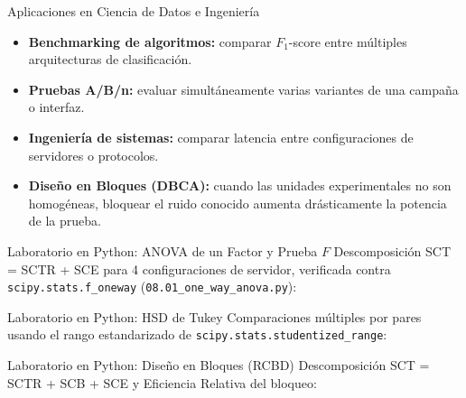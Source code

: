 \documentclass[10pt, aspectratio=169]{beamer}
\begin{document}
\begin{frame}{Aplicaciones en Ciencia de Datos e Ingeniería}
  \footnotesize
  \begin{itemize}\itemsep=0.1cm
    \item \textbf{Benchmarking de algoritmos:} comparar $F_1$-score entre múltiples arquitecturas de clasificación. \pause
    \item \textbf{Pruebas A/B/n:} evaluar simultáneamente varias variantes de una campaña o interfaz. \pause
    \item \textbf{Ingeniería de sistemas:} comparar latencia entre configuraciones de servidores o protocolos. \pause
    \item \textbf{Diseño en Bloques (DBCA):} cuando las unidades experimentales no son homogéneas, bloquear el ruido conocido aumenta drásticamente la potencia de la prueba.
  \end{itemize}
\end{frame}

\begin{frame}[fragile]{Laboratorio en Python: ANOVA de un Factor y Prueba $F$}
  \scriptsize
  Descomposición SCT = SCTR + SCE para 4 configuraciones de servidor, verificada contra \texttt{scipy.stats.f\_oneway} (\texttt{08.01\_one\_way\_anova.py}):
  {
  }
\end{frame}

\begin{frame}[fragile]{Laboratorio en Python: HSD de Tukey}
  \scriptsize
  Comparaciones múltiples por pares usando el rango estandarizado de \texttt{scipy.stats.studentized\_range}:
  {
  }
\end{frame}

\begin{frame}[fragile]{Laboratorio en Python: Diseño en Bloques (RCBD)}
  \scriptsize
  Descomposición SCT = SCTR + SCB + SCE y Eficiencia Relativa del bloqueo:
  {
  }
\end{frame}
\end{document}
